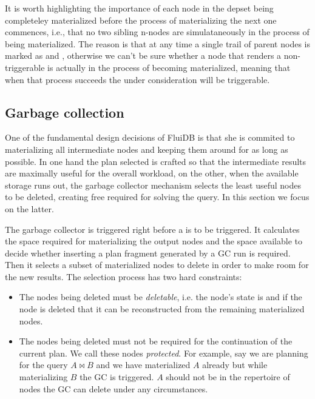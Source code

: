It is worth highlighting the importance of each node in the depset
being completeley materialized before the process of materializing the
next one commences, i.e., that no two sibling n-nodes are
simulataneously in the process of being materialized. The reason is
that at any time a single trail of parent nodes is marked as
 and , otherwise we can't be sure whether a
 node that renders a 
non-triggerable is actually in the process of becoming materialized,
meaning that when that process succeeds the  under
consideration will be triggerable.

\subsection{Garbage collection}
\label{sec:gc}

One of the fundamental design decisions of FluiDB is that she is
commited to materializing all intermediate nodes and keeping them
around for as long as possible. In one hand the plan selected is
crafted so that the intermediate results are maximally useful for the
overall workload, on the other, when the available storage runs out,
the garbage collector mechanism selects the least useful nodes to be
deleted, creating free required for solving the query. In this section
we focus on the latter.

The garbage collector is triggered right before a  is to
be triggered. It calculates the space required for materializing the
output nodes and the space available to decide whether inserting a
plan fragment generated by a GC run is required. Then it selects a
subset of materialized nodes to delete in order to make room for the
new results. The selection process has two hard constraints:

\begin{itemize}
\item The nodes being deleted must be \emph{deletable}, i.e. the
  node's state is  and if the node is deleted that it
  can be reconstructed from the remaining materialized nodes.
\item The nodes being deleted must not be required for the
  continuation of the current plan. We call these nodes
  \emph{protected}. For example, say we are planning for the query
  \(A \Join B\) and we have materialized \(A\) already but while
  materializing \(B\) the GC is triggered. \(A\) should not be in the
  repertoire of nodes the GC can delete under any circumstances.
\end{itemize}


